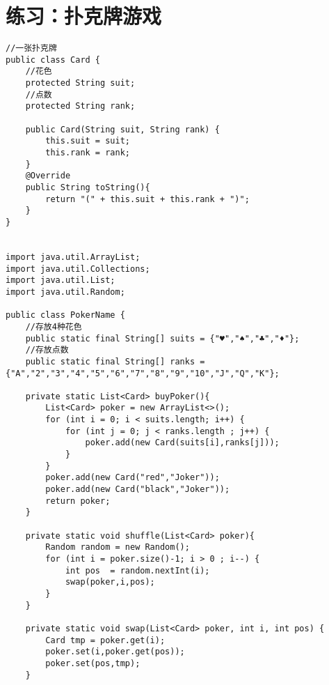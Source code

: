 \documentclass[a4paper]{report}
\begin{document}
\section{练习：扑克牌游戏}
\begin{lstlisting}
//一张扑克牌
public class Card {
    //花色
    protected String suit;
    //点数
    protected String rank;

    public Card(String suit, String rank) {
        this.suit = suit;
        this.rank = rank;
    }
    @Override
    public String toString(){
        return "(" + this.suit + this.rank + ")";
    }
}


import java.util.ArrayList;
import java.util.Collections;
import java.util.List;
import java.util.Random;

public class PokerName {
    //存放4种花色
    public static final String[] suits = {"♥","♠","♣","♦"};
    //存放点数
    public static final String[] ranks = {"A","2","3","4","5","6","7","8","9","10","J","Q","K"};

    private static List<Card> buyPoker(){
        List<Card> poker = new ArrayList<>();
        for (int i = 0; i < suits.length; i++) {
            for (int j = 0; j < ranks.length ; j++) {
                poker.add(new Card(suits[i],ranks[j]));
            }
        }
        poker.add(new Card("red","Joker"));
        poker.add(new Card("black","Joker"));
        return poker;
    }

    private static void shuffle(List<Card> poker){
        Random random = new Random();
        for (int i = poker.size()-1; i > 0 ; i--) {
            int pos  = random.nextInt(i);
            swap(poker,i,pos);
        }
    }

    private static void swap(List<Card> poker, int i, int pos) {
        Card tmp = poker.get(i);
        poker.set(i,poker.get(pos));
        poker.set(pos,tmp);
    }


\end{lstlisting}
\end{document}

